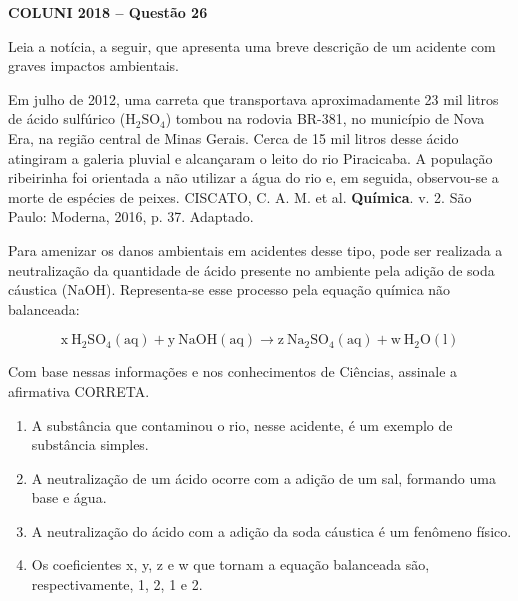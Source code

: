 \textbf{COLUNI 2018 -- Questão 26}\par\medskip Leia a notícia, a seguir, que apresenta uma breve descrição de um acidente com graves impactos ambientais.

\par

Em julho de 2012, uma carreta que transportava aproximadamente 23 mil litros de ácido sulfúrico (\(\mathrm{H_2SO_4}\)) tombou na rodovia BR-381, no município de Nova Era, na região central de Minas Gerais. Cerca de 15 mil litros desse ácido atingiram a galeria pluvial e alcançaram o leito do rio Piracicaba. A população ribeirinha foi orientada a não utilizar a água do rio e, em seguida, observou-se a morte de espécies de peixes. CISCATO, C. A. M. et al. \textbf{Química}. v. 2. São Paulo: Moderna, 2016, p. 37. Adaptado.

\par

Para amenizar os danos ambientais em acidentes desse tipo, pode ser realizada a neutralização da quantidade de ácido presente no ambiente pela adição de soda cáustica (NaOH). Representa-se esse processo pela equação química não balanceada:

\par

\[\mathrm{x\ H_2SO_4(aq) + y\ NaOH(aq)} \longrightarrow \mathrm{z\ Na_2SO_4(aq) + w\ H_2O(l)}\]

\par

Com base nessas informações e nos conhecimentos de Ciências, assinale a afirmativa CORRETA.\begin{enumerate}
\item A substância que contaminou o rio, nesse acidente, é um exemplo de substância simples.
\item A neutralização de um ácido ocorre com a adição de um sal, formando uma base e água.
\item A neutralização do ácido com a adição da soda cáustica é um fenômeno físico.
\item Os coeficientes x, y, z e w que tornam a equação balanceada são, respectivamente, 1, 2, 1 e 2.\end{enumerate}
